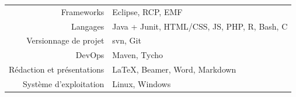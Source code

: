 \tair


\begin{tabular}{r @{~$\rangle$~} p{}}
Frameworks & Eclipse, RCP, EMF\\
Langages & Java + Junit, HTML/CSS, JS, PHP, R, Bash, C \\
Versionnage de projet & svn, Git \\
DevOps & Maven, Tycho \\
Rédaction et présentations & LaTeX, Beamer, Word, Markdown \\
Système d’exploitation & Linux, Windows \\
\end{tabular}





